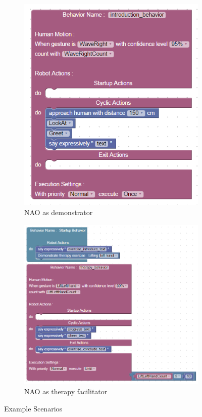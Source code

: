 \documentclass{llncs}
\begin{document}
\begin{figure}
\centering
\begin{subfigure}[t]{0.5\textwidth}
\includegraphics[width=\textwidth]{../thesis/assets/scenario1.png}
\caption[NAO as demonstrator]{NAO as demonstrator}
\label{fig:scenario1_program}
\end{subfigure}

\begin{subfigure}[t]{0.7\textwidth}
\includegraphics[width=\textwidth]{../thesis/assets/scenario2.png}
\caption[NAO as therapy facilitator]{NAO as therapy facilitator}
\label{fig:scenario2_program}
\end{subfigure}
\caption[Example Scenarios]{Example Scenarios}
\label{fig:scenarios}
\end{figure}
\end{document}
